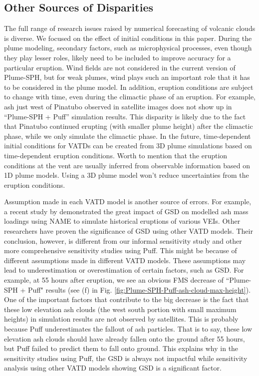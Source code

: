 \documentclass[utf8]{frontiersSCNS} %
\begin{document}
\subsection{Other Sources of Disparities}
The full range of research issues raised by numerical forecasting of volcanic clouds is diverse. We focused on the effect of initial conditions in this paper. During the plume modeling, secondary factors, such as microphysical processes, even though they play lesser roles, likely need to be included to improve accuracy for a particular eruption. Wind fields are not considered in the current version of Plume-SPH, but for weak plumes, wind plays such an important role that it has to be considered in the plume model. In addition, eruption conditions are subject to change with time, even during the climactic phase of an eruption. For example, ash just west of Pinatubo observed in satellite images does not show up in ``Plume-SPH + Puff'' simulation results. This disparity is likely due to the fact that Pinatubo continued erupting (with smaller plume height) after the climactic phase, while we only simulate the climactic phase. In the future, time-dependent initial conditions for VATDs can be created from 3D plume simulations based on time-dependent eruption conditions. Worth to mention that the eruption conditions at the vent are usually inferred from observable information based on 1D plume models. Using a 3D plume model won't reduce uncertainties from the eruption conditions.

Assumption made in each VATD model is another source of errors. For example, a recent study by \citet{osman2020sensitivity} demonstrated the great impact of GSD on modelled ash mass loadings using NAME\citep{jones2007uk} to simulate historical eruptions of various VEIs. Other researchers \citep{beckett2015sensitivity,scollo2008parametric} have proven the significance of GSD using other VATD models. Their conclusion, however, is different from our informal sensitivity study and other more comprehensive sensitivity studies using Puff. This might be because of different assumptions made in different VATD models. These assumptions may lead to underestimation or overestimation of certain factors, such as GSD. For example, at 55 hours after eruption, we see an obvious FMS decrease of ``Plume-SPH + Puff"  results (see (f) in Fig. \ref{fig:Plume-SPH-Puff-ash-cloud-max-height}). One of the important factors that contribute to the big decrease is the fact that these low elevation ash clouds (the west south portion with small maximum heights) in simulation results are not observed by satellites. This is probably because Puff underestimates the fallout of ash particles. That is to say, these low elevation ash clouds should have already fallen onto the ground after 55 hours, but Puff failed to predict them to fall onto ground. This explains why in the sensitivity studies using Puff, the GSD is always not impactful while sensitivity analysis using other VATD models showing GSD is a significant factor.
\end{document}
